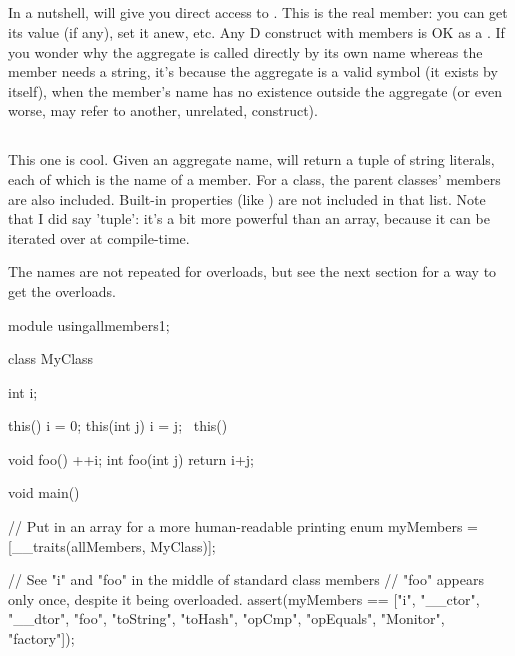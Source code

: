 \subsection{}

In a nutshell,  will give you direct access to . This is the real member: you can get its value (if any), set it anew, etc. Any D construct with members is OK as a . If you wonder why the aggregate is called directly by its own name whereas the member needs a string, it's because the aggregate is a valid symbol (it exists by itself), when the member's name has no existence outside the aggregate (or even worse, may refer to another, unrelated, construct).


\subsection{}

This one is cool. Given an aggregate name,  will return a tuple of string literals, each of which is the name of a member. For a class, the parent classes' members are also included. Built-in properties (like ) are not included in that list. Note that I did say 'tuple': it's a bit more powerful than an array, because it can be iterated over at compile-time.

The names are not repeated for overloads, but see the next section for a way to get the overloads.

\begin{dcode}
module usingallmembers1;

class MyClass 
{
    int i;
    
    this() { i = 0;}
    this(int j) { i = j;}
    ~this() { }
    
    void foo() { ++i;}
    int foo(int j) { return i+j;}
}

void main()
{
    // Put in an array for a more human-readable printing
    enum myMembers = [__traits(allMembers, MyClass)];

    // See "i" and "foo" in the middle of standard class members
    // "foo" appears only once, despite it being overloaded.
    assert(myMembers == ["i", "__ctor", "__dtor", "foo", "toString", 
                         "toHash", "opCmp", "opEquals", "Monitor", "factory"]);
}
\end{dcode}

